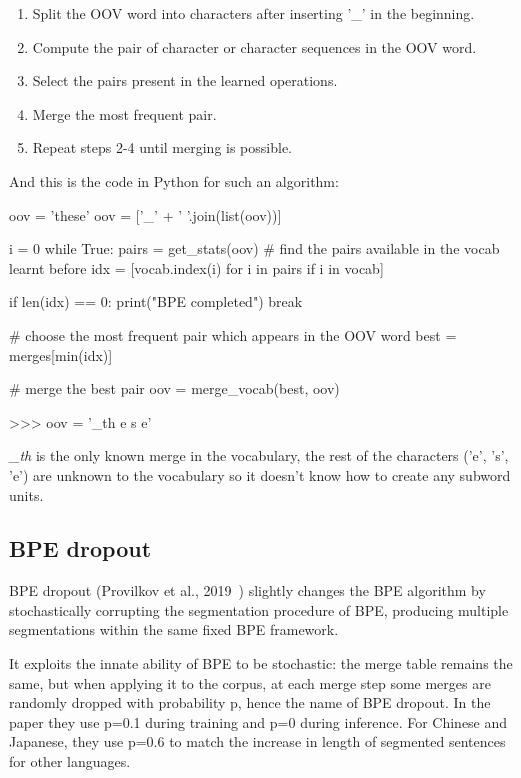 \begin{enumerate}
    \item Split the OOV word into characters after inserting '\_' in the beginning.
    \item Compute the pair of character or character sequences in the OOV word.
    \item Select the pairs present in the learned operations.
    \item Merge the most frequent pair.
    \item Repeat steps 2-4 until merging is possible.
\end{enumerate}

And this is the code in Python for such an algorithm:

\begin{python}
oov = 'these'
oov = ['_' + ' '.join(list(oov))]

i = 0
while True:
    pairs = get_stats(oov)
    # find the pairs available in the vocab learnt before
    idx = [vocab.index(i) for i in pairs if i in vocab]

    if len(idx) == 0:
        print("BPE completed")
        break

    # choose the most frequent pair which appears in the OOV word
    best = merges[min(idx)]

    # merge the best pair
    oov = merge_vocab(best, oov)

>>> oov = '_th e s e'
\end{python}

\emph{\_th} is the only known merge in the vocabulary, the rest of the characters ('e', 's', 'e') are unknown to the vocabulary so it doesn't know how to create any subword units.

\subsection{BPE dropout}

BPE dropout (Provilkov et al., 2019~\cite{provilkov2019bpedropout}) slightly changes the BPE algorithm by stochastically corrupting the segmentation procedure of BPE, producing multiple segmentations within the same fixed BPE framework.

It exploits the innate ability of BPE to be stochastic: the merge table remains the same, but when applying it to the corpus, at each merge step some merges are randomly dropped with probability p, hence the name of BPE dropout. In the paper they use p=0.1 during training and p=0 during inference. For Chinese and Japanese, they use p=0.6 to match the increase in length of segmented sentences for other languages.

